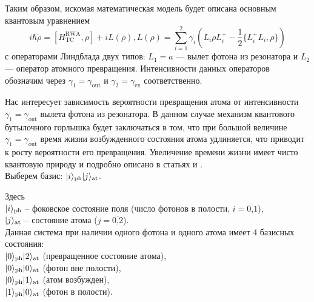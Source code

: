 Таким образом, искомая математическая модель будет описана основным квантовым уравнением \cite{breuer}
\begin{equation}\label{sec2_master_eq}
	i\hbar\dot\rho = [H_{\text{TC}}^{\text{RWA}}, \rho] + iL(\rho), L(\rho) = \sum_{i=1}^{2}\gamma_{i}(L_{i}\rho L_{i}^{+} - \frac{1}{2}\{L_{i}^{+}L_{i}, \rho\})
\end{equation}
с операторами Линдблада двух типов: $L_{1} = a$ --- вылет фотона из резонатора \cite{breuer,photon_emission} и $L_{2}$ --- оператор атомного превращения. Интенсивности данных операторов обозначим через $\gamma_{1} = \gamma_{\text{out}}$ и $\gamma_{2} = \gamma_{\text{ex}}$ соответственно.

Нас интересует зависимость вероятности превращения атома от интенсивности $\gamma_{1} = \gamma_{\text{out}}$ вылета фотона из резонатора. В данном случае механизм квантового бутылочного горлышка будет заключаться в том, что при большой величине $\gamma_{1} = \gamma_{\text{out}}$ время жизни возбужденного состояния атома удлиняется, что приводит к росту вероятности его превращения. Увеличение времени жизни имеет чисто квантовую природу и подробно описано в статьях \cite{quantum_bottleneck_victorova} и \cite{quantum_simulation_homogeneous}.
\\[18pt]
\noindent Выберем базис: $|i\rangle_{\text{ph}}|j\rangle_{\text{at}}$.

\noindent Здесь\\
\indent\qquad $|i\rangle_{\text{ph}}$ -- фоковское состояние поля (число фотонов в полости, $i=\overline{\mbox{0,1}}$),\\
\indent\qquad $|j\rangle_{\text{at}}$ -- состояние атома ($j=\overline{\mbox{0,2}}$).
\\[18pt]
\noindent Данная система при наличии одного фотона и одного атома имеет 4 базисных состояния:\\
\indent\qquad $|0\rangle_{\text{\text{ph}}}|2\rangle_{\text{\text{at}}}$ (превращенное состояние атома),\\
\indent\qquad $|0\rangle_{\text{\text{ph}}}|0\rangle_{\text{\text{at}}}$ (фотон вне полости),\\
\indent\qquad $|0\rangle_{\text{\text{ph}}}|1\rangle_{\text{\text{at}}}$ (атом возбужден),\\
\indent\qquad $|1\rangle_{\text{\text{ph}}}|0\rangle_{\text{\text{at}}}$ (фотон в полости).
\\[18pt]

